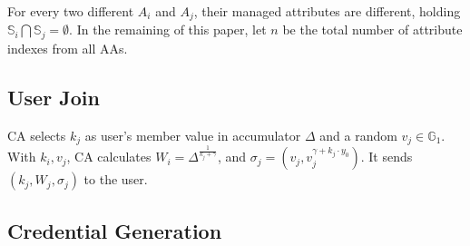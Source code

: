 \documentclass[journal]{IEEEtran}
\begin{document}
	For every two different $A_i$ and $A_j$, their managed attributes are different, holding $\mathbb{S}_i \bigcap \mathbb{S}_j = \emptyset$. In the remaining of this paper, let $n$ be the total number of attribute indexes from all AAs.
	\subsection{User Join}
	CA selects $k_j$ as user's member value in accumulator $\Delta$ and a random $v_j \in \mathbb{G}_1$. With $k_i, v_j$, CA calculates $W_i = \Delta^{\frac{1}{k_j + \gamma}}$, and $\sigma_j = (v_j, v_j^{\gamma+ k_j\cdot y_0})$. It sends $(k_j, W_j, \sigma_j)$ to the user. 
	
	\subsection{Credential Generation}
	
\end{document}
